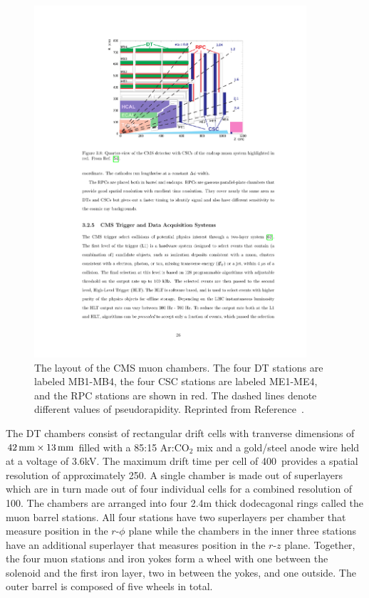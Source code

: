 \begin{figure}[htbp]
  \centering
  \includegraphics[width=0.9\textwidth]{Detector/Figures/cms_muons.pdf}
  \caption{
    The layout of the CMS muon chambers.
    The four DT stations are labeled MB1-MB4, the four CSC stations are labeled ME1-ME4, and the RPC stations are shown in red.
    The dashed lines denote different values of pseudorapidity.
    Reprinted from Reference~\cite{CMS2008}.
  }
  \label{fig:cms_muons}
\end{figure}

The DT chambers consist of rectangular drift cells with tranverse dimensions of $42\,\text{mm} \times 13\,\text{mm}$ filled with a 85:15 Ar:CO$_2$ mix and a gold/steel anode wire held at a voltage of 3.6\unit{kV}.
The  maximum drift time per cell of 400\ns\ provides a spatial resolution of approximately 250\mum.
A single chamber is made out of superlayers which are in turn made out of four individual cells for a combined resolution of 100\mum.
The chambers are arranged into four 2.4\unit{m} thick dodecagonal rings called the muon barrel stations.
All four stations have two superlayers per chamber that measure position in the $r$-$\phi$ plane while the chambers in the inner three stations have an additional superlayer that measures position in the $r$-$z$ plane.
Together, the four muon stations and iron yokes form a wheel with one between the solenoid and the first iron layer, two in between the yokes, and one outside.
The outer barrel is composed of five wheels in total. 

